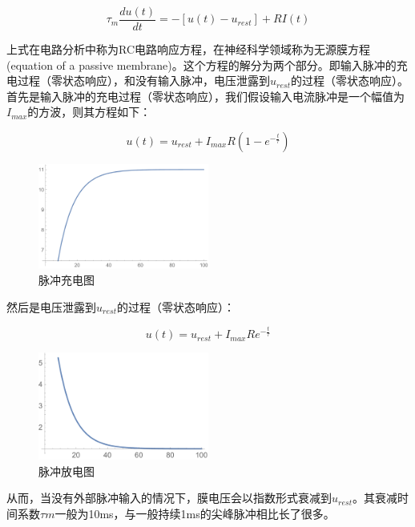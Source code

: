 \documentclass[12pt, a4paper, oneside]{ctexbook}
\begin{document}
\begin{equation}
    \tau _m\frac{du(t)}{dt}= -[u(t)-u_{rest}] + RI(t)
\end{equation}

上式在电路分析中称为RC电路响应方程，在神经科学领域称为无源膜方程(equation of a passive membrane)。这个方程的解分为两个部分。即输入脉冲的充电过程（零状态响应），和没有输入脉冲，电压泄露到$u_{rest}$的过程（零状态响应）。首先是输入脉冲的充电过程（零状态响应），我们假设输入电流脉冲是一个幅值为$I_{max}$的方波，则其方程如下：

\begin{equation}
    u(t)=u_{rest}+I_{max}R(1-e^{-\frac{t}{\tau}})
\end{equation}

\begin{figure}[H]
    \centering
    \includegraphics[width=0.5\textwidth]{脉冲充电图.pdf}
    \caption{脉冲充电图}
\end{figure} 

然后是电压泄露到$u_{rest}$的过程（零状态响应）：

\begin{equation}
    u(t)=u_{rest}+I_{max}Re^{-\frac{t}{\tau}}
\end{equation}

\begin{figure}[H]
    \centering
    \includegraphics[width=0.5\textwidth]{脉冲放电图.pdf}
    \caption{脉冲放电图}
\end{figure} 

从而，当没有外部脉冲输入的情况下，膜电压会以指数形式衰减到$u_{rest}$。其衰减时间系数$\tau m$一般为10ms，与一般持续1ms的尖峰脉冲相比长了很多。
\end{document}
